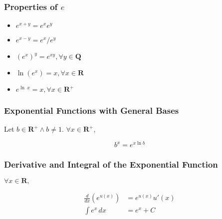 \subsubsection{Properties of $e$}
\begin{itemize}
\item $e^{x+y} = e^x e^y$
\item $e^{x - y} = e^x / e^y$
\item $(e^x)^y = e^{xy}, \forall y \in \mathbf{Q}$
\item $\ln (e^x) = x, \forall x \in \mathbf{R}$
\item $e^{\ln \ x} = x, \forall x \in \mathbf{R}^+$
\end{itemize}

\subsubsection{Exponential Functions with General Bases}
Let $b \in \mathbf{R}^+ \wedge b \neq 1$. $\forall x \in \mathbf{R}^+$,

\begin{equation}
b^x = e^{x \ln b}
\end{equation}

\subsubsection{Derivative and Integral of the Exponential Function}
$\forall x \in \mathbf{R}, $

\begin{align}
\frac{d}{dx}(e^{u(x)}) &= e^{u(x)}u'(x) \\
\int e^x\, dx &= e^x + C
\end{align}
